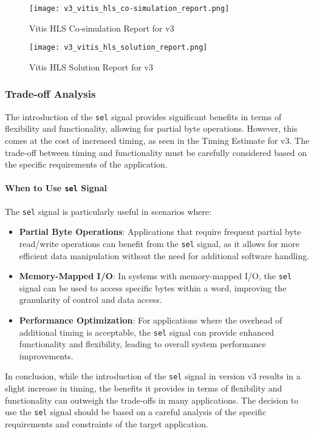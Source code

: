 \documentclass[conference]{IEEEtran}
\begin{document}
\begin{figure}[htbp]
    \centering
    \texttt{[image: v3\_vitis\_hls\_co-simulation\_report.png]}
    \caption{Vitis HLS Co-simulation Report for v3}
    \label{fig:v3_vitis_hls_co-simulation_report}
\end{figure}

\begin{figure}[h]
    \centering
    \texttt{[image: v3\_vitis\_hls\_solution\_report.png]}
    \caption{Vitis HLS Solution Report for v3}
    \label{fig:v3_vitis_hls_solution_report}
\end{figure}

\subsubsection{Trade-off Analysis}
The introduction of the \texttt{sel} signal provides significant benefits in terms of flexibility and functionality, allowing for partial byte operations. However, this comes at the cost of increased timing, as seen in the Timing Estimate for v3. The trade-off between timing and functionality must be carefully considered based on the specific requirements of the application.

\paragraph{When to Use \texttt{sel} Signal}
The \texttt{sel} signal is particularly useful in scenarios where:
\begin{itemize}
    \item \textbf{Partial Byte Operations}: Applications that require frequent partial byte read/write operations can benefit from the \texttt{sel} signal, as it allows for more efficient data manipulation without the need for additional software handling.
    \item \textbf{Memory-Mapped I/O}: In systems with memory-mapped I/O, the \texttt{sel} signal can be used to access specific bytes within a word, improving the granularity of control and data access.
    \item \textbf{Performance Optimization}: For applications where the overhead of additional timing is acceptable, the \texttt{sel} signal can provide enhanced functionality and flexibility, leading to overall system performance improvements.
\end{itemize}

In conclusion, while the introduction of the \texttt{sel} signal in version v3 results in a slight increase in timing, the benefits it provides in terms of flexibility and functionality can outweigh the trade-offs in many applications. The decision to use the \texttt{sel} signal should be based on a careful analysis of the specific requirements and constraints of the target application.
\end{document}
